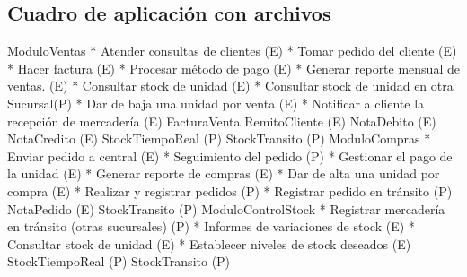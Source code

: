\subsection{Cuadro de aplicación con archivos}

\begin{cuadroAplicacionArchivos}
  \cuadroAplicacionArchivosItem
    {ModuloVentas}
    {* Atender consultas de clientes (E) \newline
	* Tomar pedido del cliente (E)\newline
 	* Hacer factura (E)\newline
	* Procesar método de pago (E)\newline
	* Generar reporte mensual de ventas. (E)\newline
	* Consultar stock de unidad (E)\newline
	* Consultar stock de unidad en otra Sucursal(P)\newline
	* Dar de baja una unidad por venta (E)\newline
	* Notificar a cliente la recepción de mercadería (E)\newline
	}
	{FacturaVenta \newline
	 RemitoCliente (E)
	 NotaDebito (E)
	 NotaCredito (E)
	 StockTiempoReal (P)
	 StockTransito (P)
	 }
  \cuadroAplicacionArchivosItem
    {ModuloCompras}
    {* Enviar pedido a central (E)\newline
	 * Seguimiento del pedido (P)\newline
	 * Gestionar el pago de la unidad (E)\newline
	 * Generar reporte de compras (E)\newline
	 * Dar de alta una unidad por compra (E)\newline
	 * Realizar y registrar pedidos (P)\newline
	 * Registrar pedido en tránsito (P)\newline
	}
	{NotaPedido (E) \newline
	 StockTransito (P)}
  \cuadroAplicacionArchivosItem
    {ModuloControlStock}
    {* Registrar mercadería en tránsito (otras sucursales) (P)\newline
	 * Informes de variaciones de stock (E)\newline
	 * Consultar stock de unidad (E)\newline
	 * Establecer niveles de stock deseados (E) \newline
	 }
	{StockTiempoReal (P) \newline
	 StockTransito (P)}
\end{cuadroAplicacionArchivos}

